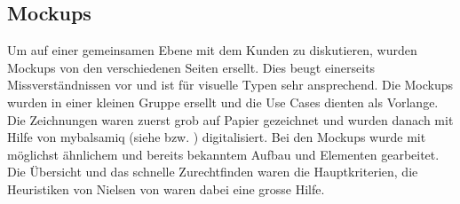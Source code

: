 \FloatBarrier
\subsection{Mockups}\label{mockups}
Um auf einer gemeinsamen Ebene mit dem Kunden zu diskutieren, wurden Mockups von den verschiedenen Seiten ersellt. Dies beugt einerseits Missverständnissen vor und ist für visuelle Typen sehr ansprechend. Die Mockups wurden in einer kleinen Gruppe ersellt und die Use Cases dienten als Vorlange. Die Zeichnungen waren zuerst grob auf Papier gezeichnet und wurden danach mit Hilfe von mybalsamiq (siehe \cite{zhaw_mybalsamiq} bzw. \cite{mybalsamiq}) digitalisiert. Bei den Mockups wurde mit möglichst ähnlichem und bereits bekanntem Aufbau und Elementen gearbeitet. Die Übersicht und das schnelle Zurechtfinden waren die Hauptkriterien, die Heuristiken von Nielsen von \cite{paper_usability} waren dabei eine grosse Hilfe.

